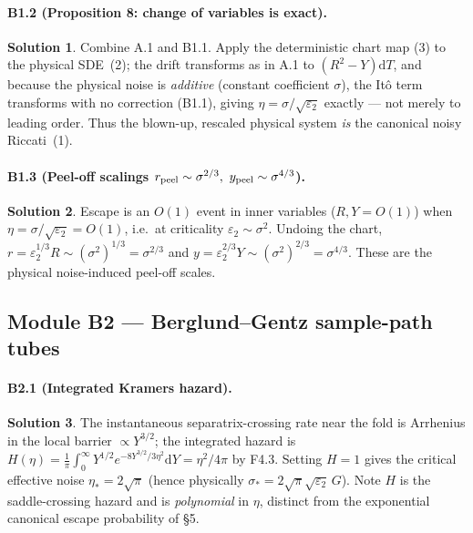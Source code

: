 \documentclass[11pt]{article}
\newcommand{\ep}{\varepsilon_2}
\newcommand{\dd}{\mathrm{d}}
\theoremstyle{definition}
\newtheorem*{sol}{Solution}
\begin{document}
\paragraph{B1.2 (Proposition 8: change of variables is exact).}
\begin{sol}
Combine A.1 and B1.1. Apply the deterministic chart map (3) to the physical SDE~(2); the drift
transforms as in A.1 to $(R^2-Y)\dd T$, and because the physical noise is \emph{additive}
(constant coefficient $\sigma$), the It\^o term transforms with no correction (B1.1), giving
$\eta=\sigma/\sqrt{\ep}$ exactly --- not merely to leading order. Thus the blown-up,
rescaled physical system \emph{is} the canonical noisy Riccati~(1).
\end{sol}

\paragraph{B1.3 (Peel-off scalings $r_{\rm peel}\sim\sigma^{2/3},\ y_{\rm peel}\sim\sigma^{4/3}$).}
\begin{sol}
Escape is an $O(1)$ event in inner variables ($R,Y=O(1)$) when $\eta=\sigma/\sqrt{\ep}=O(1)$, i.e.\
at criticality $\ep\sim\sigma^2$. Undoing the chart, $r=\ep^{1/3}R\sim(\sigma^2)^{1/3}=\sigma^{2/3}$
and $y=\ep^{2/3}Y\sim(\sigma^2)^{2/3}=\sigma^{4/3}$. These are the physical noise-induced
peel-off scales.
\end{sol}

\subsection*{Module B2 --- Berglund--Gentz sample-path tubes}

\paragraph{B2.1 (Integrated Kramers hazard).}
\begin{sol}
The instantaneous separatrix-crossing rate near the fold is Arrhenius in the local barrier
$\propto Y^{3/2}$; the integrated hazard is
$H(\eta)=\tfrac1\pi\int_0^\infty Y^{1/2}e^{-8Y^{3/2}/3\eta^2}\dd Y=\eta^2/4\pi$ by F4.3. Setting
$H=1$ gives the critical effective noise $\eta_*=2\sqrt\pi$ (hence physically
$\sigma_*=2\sqrt\pi\sqrt{\ep}\,G$). Note $H$ is the saddle-crossing hazard and is
\emph{polynomial} in $\eta$, distinct from the exponential canonical escape probability of \S5.
\end{sol}
\end{document}
